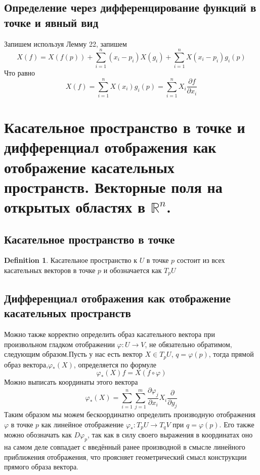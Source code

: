 \documentclass[a4paper,12pt]{article} %
\theoremstyle{definition}
\newtheorem{definition}{Definition}[section]
\begin{document}
\subsection{Определение через дифференцирование функций в точке и явный вид}
Запишем используя Лемму 22, запишем
\begin{equation}
	X(f) = X(f(p)) + \sum_{i = 1}^n (x_i - p_i) X(g_i) + \sum_{i = 1}^n X(x_i - p_i)g_i(p)
\end{equation}
Что равно
\begin{equation}
	X(f) = \sum_{i = 1}^n  X(x_i)g_i(p) = \sum_{i = 1}^n X_i \frac{\partial f}{\partial x_i}
\end{equation}
\section{Касательное пространство в точке и дифференциал отображения как отображение касательных пространств. Векторные поля на открытых областях в $\mathbb{R}^n$.}
\subsection{Касательное пространство в точке}
\begin{definition}
	Касательное пространство к $U$ в точке $p$ состоит из всех касательных векторов в точке $p$ и обозначается как $T_p U$
\end{definition}
\subsection{Дифференциал отображения как отображение касательных пространств}
Можно также корректно определить образ касательного вектора при произвольном гладком отображении $\varphi : U \rightarrow V$, не обязательно обратимом, следующим образом.Пусть у нас есть вектор $X \in T_p U$, $q=\varphi(p)$, тогда прямой образ вектора,$\varphi_*(X)$, определяется по формуле
\begin{equation}
	\varphi_*(X)f = X (f \circ \varphi)
\end{equation}
Можно выписать координаты этого вектора
\begin{equation}
	\varphi_*(X) = \sum_{i=1}^n \sum_{j=1}^m \frac{\partial \varphi_j}{\partial x_i} X_i \frac{\partial}{\partial y_j}
\end{equation}
Таким образом мы можем бескоординатно определить производную отображения $\varphi$ в точке $p$ как линейное отображение $\varphi_* : T_pU \rightarrow T_qV$ при $q=\varphi(p)$. Его также можно обозначать как $D\varphi_p$, так как в силу своего выражения в координатах оно на самом деле совпадает с введённый ранее производной в смысле линейного приближения отображения, что проясняет геометрический смысл конструкции прямого образа вектора.
\end{document}
